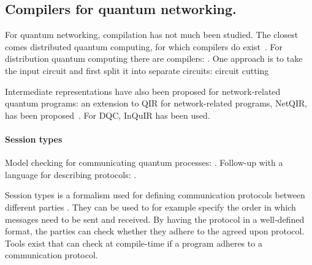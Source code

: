 


\subsection{Compilers for quantum networking.}
For quantum networking, compilation has not much been studied.
The closest comes distributed quantum computing, for which compilers do exist~\cite{ferrari_compiler_2021, chatterjee_qurzon_2022, cuomo_optimized_2023, ferrari_modular_2023}.
For distribution quantum computing there are compilers: \cite{ferrari_compiler_2021, haner_distributed_2021, cuomo_optimized_2023, ferrari_modular_2023}.
One approach is to take the input circuit and first split it into separate circuits: circuit cutting~\cite{chatterjee_qurzon_2022}

Intermediate representations have also been proposed for network-related quantum programs:
an extension to QIR for network-related programs, NetQIR, has been proposed~\cite{vazquez-perez_netqir_2024}.
For DQC, InQuIR has been used.


\paragraph{Session types}
Model checking for communicating quantum processes: \cite{davidson_model_nodate}.
Follow-up with a language for describing protocols: \cite{ardeshir-larijani_automated_2018}.

Session types is a formalism used for defining communication protocols between different parties \cite{honda_language_1998}.
They can be used to for example specify the order in which messages need to be sent and received.
By having the protocol in a well-defined format, the parties can check whether they adhere to the agreed upon protocol.
Tools exist that can check at compile-time if a program adheres to a communication protocol.

